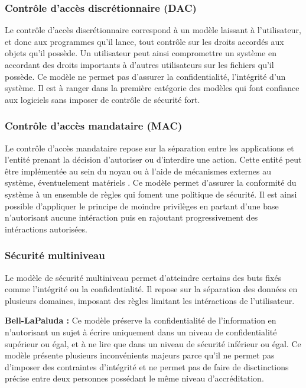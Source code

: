 \subsubsection{Contrôle d'accès discrétionnaire (DAC)}

Le contrôle d'accès discrétionnaire correspond à un modèle laissant à l'utilisateur, et donc aux programmes qu'il lance, tout contrôle sur les droits accordés aux objets qu'il possède. Un utilisateur peut ainsi compromettre un système en accordant des droits importants à d'autres utilisateurs sur les fichiers qu'il possède. Ce modèle ne permet pas d'assurer la confidentialité, l'intégrité d'un système. Il est à ranger dans la première catégorie des modèles qui font confiance aux logiciels sans imposer de contrôle de sécurité fort.

\subsubsection{Contrôle d'accès mandataire (MAC)}

Le contrôle d'accès mandataire repose sur la séparation entre les applications et l'entité prenant la décision d'autoriser ou d'interdire une action. Cette entité peut être implémentée au sein du noyau ou à l'aide de mécanismes externes au système, éventuelement matériels \cite{ITXT}. Ce modèle permet d'assurer la conformité du système à un ensemble de règles qui foment une politique de sécurité. Il est ainsi possible d'appliquer le principe de moindre privilèges en partant d'une base n'autorisant aucune intéraction puis en rajoutant progressivement des intéractions autorisées.


\subsubsection{Sécurité multiniveau}

Le modèle de sécurité multiniveau permet d'atteindre certains des buts fixés comme l'intégrité ou la confidentialité. Il repose sur la séparation des données en plusieurs domaines, imposant des règles limitant les intéractions de l'utilisateur.

\textbf{Bell-LaPaluda :} Ce modèle préserve la confidentialité de l'information en n'autorisant un sujet à écrire uniquement dans un niveau de confidentialité supérieur ou égal, et à ne lire que dans un niveau de sécurité inférieur ou égal. Ce modèle présente plusieurs inconvénients majeurs parce qu'il ne permet pas d'imposer des contraintes d'intégrité et ne permet pas de faire de disctinctions précise entre deux personnes possédant le même niveau d'accréditation.

